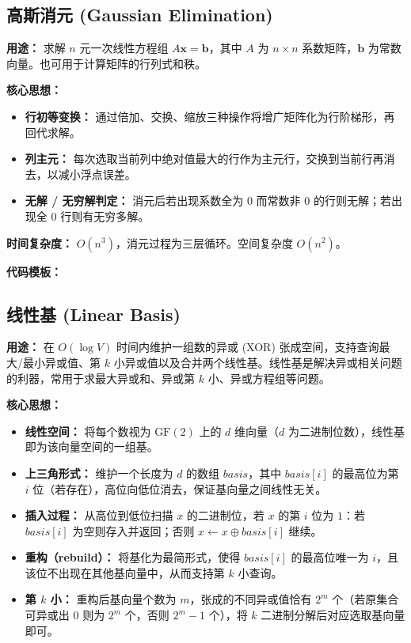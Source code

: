 

\subsection{高斯消元 (Gaussian Elimination)}

\textbf{用途：}
求解 $n$ 元一次线性方程组 $A \boldsymbol{x} = \boldsymbol{b}$，其中 $A$ 为 $n \times n$ 系数矩阵，$\boldsymbol{b}$ 为常数向量。也可用于计算矩阵的行列式和秩。

\textbf{核心思想：}
\begin{itemize}
    \item \textbf{行初等变换：} 通过倍加、交换、缩放三种操作将增广矩阵化为行阶梯形，再回代求解。
    \item \textbf{列主元：} 每次选取当前列中绝对值最大的行作为主元行，交换到当前行再消去，以减小浮点误差。
    \item \textbf{无解 / 无穷解判定：} 消元后若出现系数全为 $0$ 而常数非 $0$ 的行则无解；若出现全 $0$ 行则有无穷多解。
\end{itemize}

\textbf{时间复杂度：} $O(n^3)$，消元过程为三层循环。空间复杂度 $O(n^2)$。

\textbf{代码模板：}



\subsection{线性基 (Linear Basis)}

\textbf{用途：}
在 $O(\log V)$ 时间内维护一组数的异或 (XOR) 张成空间，支持查询最大/最小异或值、第 $k$ 小异或值以及合并两个线性基。线性基是解决异或相关问题的利器，常用于求最大异或和、异或第 $k$ 小、异或方程组等问题。

\textbf{核心思想：}
\begin{itemize}
    \item \textbf{线性空间：} 将每个数视为 $\text{GF}(2)$ 上的 $d$ 维向量（$d$ 为二进制位数），线性基即为该向量空间的一组基。
    \item \textbf{上三角形式：} 维护一个长度为 $d$ 的数组 $basis$，其中 $basis[i]$ 的最高位为第 $i$ 位（若存在），高位向低位消去，保证基向量之间线性无关。
    \item \textbf{插入过程：} 从高位到低位扫描 $x$ 的二进制位，若 $x$ 的第 $i$ 位为 $1$：若 $basis[i]$ 为空则存入并返回；否则 $x \gets x \oplus basis[i]$ 继续。
    \item \textbf{重构（rebuild）：} 将基化为最简形式，使得 $basis[i]$ 的最高位唯一为 $i$，且该位不出现在其他基向量中，从而支持第 $k$ 小查询。
    \item \textbf{第 $k$ 小：} 重构后基向量个数为 $m$，张成的不同异或值恰有 $2^m$ 个（若原集合可异或出 $0$ 则为 $2^m$ 个，否则 $2^m-1$ 个），将 $k$ 二进制分解后对应选取基向量即可。
\end{itemize}

